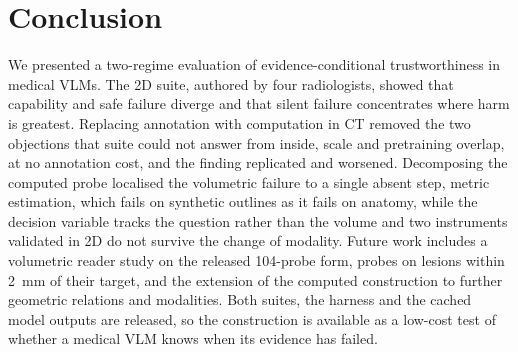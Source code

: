 \section{Conclusion}
\label{sec:conclusion}

We presented a two-regime evaluation of evidence-conditional trustworthiness
in medical VLMs. The 2D suite, authored by four radiologists, showed that
capability and safe failure diverge and that silent failure concentrates
where harm is greatest. Replacing annotation with computation in CT removed
the two objections that suite could not answer from inside, scale and
pretraining overlap, at no annotation cost, and the finding replicated and
worsened. Decomposing the computed probe localised the volumetric
failure to a single absent step, metric estimation, which fails on synthetic
outlines as it fails on anatomy, while the decision variable tracks the
question rather than the volume and two instruments validated in 2D do not
survive the change of modality. Future work includes a volumetric reader
study on the released 104-probe form, probes on lesions within 2~mm of their
target, and the extension of the computed construction to further geometric
relations and modalities. Both suites, the harness and the cached model
outputs are released, so the construction is available as a low-cost test of
whether a medical VLM knows when its evidence has failed.




